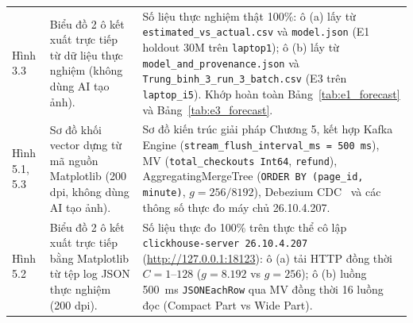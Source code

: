 \documentclass[13pt,a4paper]{report}
\begin{document}
\begin{table}[!htb]
\begin{tabularx}{\textwidth}{>{\bfseries\raggedright\arraybackslash}p{2.25cm} >{\raggedright\arraybackslash}p{5.55cm} >{\raggedright\arraybackslash}X}
\addlinespace
Hình 3.3 & Biểu đồ 2 ô kết xuất trực tiếp từ dữ liệu thực nghiệm (không dùng AI tạo ảnh). & Số liệu thực nghiệm thật 100\%: ô (a) lấy từ \texttt{estimated\_\allowbreak{}vs\_\allowbreak{}actual.csv} và \texttt{model.json} (E1 holdout 30M trên \texttt{laptop1}); ô (b) lấy từ \texttt{model\_\allowbreak{}and\_\allowbreak{}provenance.json} và \texttt{Trung\_\allowbreak{}binh\_\allowbreak{}3\_\allowbreak{}run\_\allowbreak{}3\_\allowbreak{}batch.csv} (E3 trên \texttt{laptop\_\allowbreak{}i5}). Khớp hoàn toàn Bảng~\ref{tab:e1_forecast} và Bảng~\ref{tab:e3_forecast}. \\
\addlinespace
Hình 5.1, 5.3 & Sơ đồ khối vector dựng từ mã nguồn Matplotlib (200 dpi, không dùng AI tạo ảnh). & Sơ đồ kiến trúc giải pháp Chương 5, kết hợp Kafka Engine (\texttt{stream\_\allowbreak{}flush\_\allowbreak{}interval\_\allowbreak{}ms = 500~ms}), MV (\texttt{total\_\allowbreak{}checkouts Int64}, \texttt{refund}), AggregatingMergeTree (\texttt{ORDER BY (page\_\allowbreak{}id, minute)}, $g = 256/8192$), Debezium CDC~\cite{P11} và các thông số thực đo máy chủ 26.10.4.207. \\
\addlinespace
Hình 5.2 & Biểu đồ 2 ô kết xuất trực tiếp bằng Matplotlib từ tệp log JSON thực nghiệm (200 dpi). & Số liệu thực đo 100\% trên thực thể cô lập \texttt{clickhouse-server 26.10.4.207} (\url{http://127.0.0.1:18123}): ô (a) tải HTTP đồng thời $C = 1\text{--}128$ ($g = 8.192$ vs $g = 256$); ô (b) luồng 500~ms \texttt{JSONEachRow} qua MV đồng thời 16 luồng đọc (Compact Part vs Wide Part). \\
\bottomrule
\end{tabularx}
\end{table}
\end{document}
